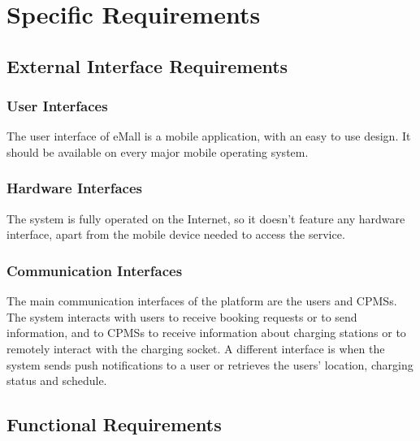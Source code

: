 \section{Specific Requirements}
\subsection{External Interface Requirements}
\subsubsection{User Interfaces}
The user interface of eMall is a mobile application, with an easy to use design.
It should be available on every major mobile operating system.
\subsubsection{Hardware Interfaces}
The system is fully operated on the Internet, so it doesn't feature any hardware interface, apart from the mobile device needed to access the service.
\subsubsection{Communication Interfaces}
The main communication interfaces of the platform are the users and CPMSs.
The system interacts with users to receive booking requests or to send information, and to CPMSs to receive information about charging stations or to remotely interact with the charging socket.
A different interface is when the system sends push notifications to a user or retrieves the users' location, charging status and schedule.
\subsection{Functional Requirements}

